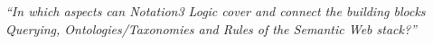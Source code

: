 

\emph{ 
``In which aspects can Notation3 Logic cover and connect the building blocks \emph{Querying}, \emph{Ontologies/Taxonomies} and \emph{Rules} 
of the Semantic Web stack?''
}

